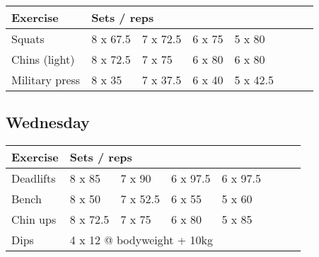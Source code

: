 \documentclass[12pt, a4paper]{article}%
\begin{document}
  \begin{tabular}{l|lllllll}
  \hspace{0.75em} \textbf{Exercise} & \multicolumn{ 7 }{l}{ \textbf{Sets / reps} } \\ \hline

            \hspace{0.75em} Squats
            & 8 x 67.5
            & 7 x 72.5
            & 6 x 75
            & 5 x 80
            & 
            & 
            & 
            \\


            \hspace{0.75em} Chins (light)
            & 8 x 72.5
            & 7 x 75
            & 6 x 80
            & 6 x 80
            & 
            & 
            & 
            \\


            \hspace{0.75em} Military press
            & 8 x 35
            & 7 x 37.5
            & 6 x 40
            & 5 x 42.5
            & 
            & 
            & 
            \\


  \end{tabular}

  \subsection*{\hspace{0.5em} Wednesday }


  \begin{tabular}{l|lllllll}
  \hspace{0.75em} \textbf{Exercise} & \multicolumn{ 7 }{l}{ \textbf{Sets / reps} } \\ \hline

            \hspace{0.75em} Deadlifts
            & 8 x 85
            & 7 x 90
            & 6 x 97.5
            & 6 x 97.5
            & 
            & 
            & 
            \\


            \hspace{0.75em} Bench
            & 8 x 50
            & 7 x 52.5
            & 6 x 55
            & 5 x 60
            & 
            & 
            & 
            \\


            \hspace{0.75em} Chin ups
            & 8 x 72.5
            & 7 x 75
            & 6 x 80
            & 5 x 85
            & 
            & 
            & 
            \\


   \hspace{0.75em} Dips &  \multicolumn{ 7 }{l}{ 4 x 12 @ bodyweight + 10kg } \\
  \end{tabular}
\end{document}
